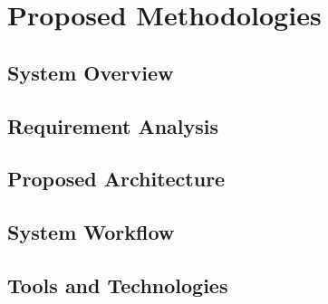 \chapter{Proposed Methodologies}
\label{chapter_proposedMethod}

\section{System Overview}
\section{Requirement Analysis}
\section{Proposed Architecture}
\label{sec:vdg-algorithm}
\section{System Workflow}
\section{Tools and Technologies}
